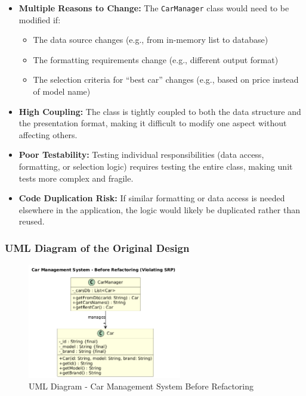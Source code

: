 \begin{itemize}
    \item \textbf{Multiple Reasons to Change:} The \texttt{CarManager} class would need to be modified if:
    \begin{itemize}
        \item The data source changes (e.g., from in-memory list to database)
        \item The formatting requirements change (e.g., different output format)
        \item The selection criteria for ``best car'' changes (e.g., based on price instead of model name)
    \end{itemize}
    
    \item \textbf{High Coupling:} The class is tightly coupled to both the data structure and the presentation format, making it difficult to modify one aspect without affecting others.
    
    \item \textbf{Poor Testability:} Testing individual responsibilities (data access, formatting, or selection logic) requires testing the entire class, making unit tests more complex and fragile.
    
    \item \textbf{Code Duplication Risk:} If similar formatting or data access is needed elsewhere in the application, the logic would likely be duplicated rather than reused.
\end{itemize}

\subsubsection{UML Diagram of the Original Design}

\begin{figure}[H]
    \centering
    \includegraphics[width=0.6\textwidth]{SRP/plantUML/before.png}
    \caption{UML Diagram - Car Management System Before Refactoring}
    \label{fig:srp_before}
\end{figure}

